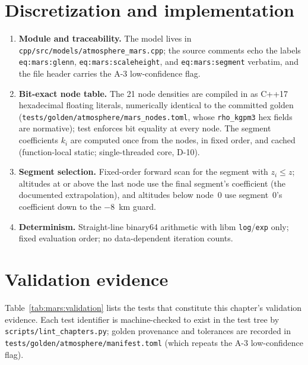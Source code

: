\section{Discretization and implementation}
\label{sec:mars:implementation}

\begin{enumerate}
  \item \textbf{Module and traceability.} The model lives in
    \texttt{cpp/src/models/atmosphere\_mars.cpp}; the source comments
    echo the labels \texttt{eq:mars:glenn},
    \texttt{eq:mars:scaleheight}, and \texttt{eq:mars:segment} verbatim,
    and the file header carries the A-3 low-confidence flag.
  \item \textbf{Bit-exact node table.} The 21 node densities are
    compiled in as C++17 hexadecimal floating literals, numerically
    identical to the committed golden
    (\texttt{tests/golden/atmosphere/mars\_nodes.toml}, whose
    \texttt{rho\_kgpm3} hex fields are normative); test
     enforces bit equality at every node. The
    segment coefficients $k_i$ are computed once from the nodes, in
    fixed order, and cached (function-local static; single-threaded
    core, D-10).
  \item \textbf{Segment selection.} Fixed-order forward scan for the
    segment with $z_i \le z$; altitudes at or above the last node use
    the final segment's coefficient (the documented extrapolation), and
    altitudes below node~0 use segment~0's coefficient down to the
    \qty{-8}{\kilo\metre} guard.
  \item \textbf{Determinism.} Straight-line binary64 arithmetic with
    libm \texttt{log}/\texttt{exp} only; fixed evaluation order; no
    data-dependent iteration counts.
\end{enumerate}

\section{Validation evidence}
\label{sec:mars:validation}

Table~\ref{tab:mars:validation} lists the tests that constitute this
chapter's validation evidence. Each test identifier is machine-checked to
exist in the test tree by \texttt{scripts/lint\_chapters.py}; golden
provenance and tolerances are recorded in
\texttt{tests/golden/atmosphere/manifest.toml} (which repeats the A-3
low-confidence flag).

